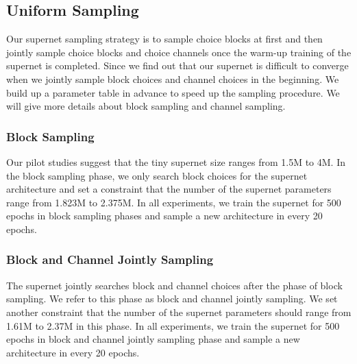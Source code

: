 \documentclass[journal]{IEEEtran}
\begin{document}
\subsection{\textbf{Uniform Sampling}}
Our supernet sampling strategy is to sample choice blocks at first and then jointly sample choice blocks and choice channels once the warm-up training of the supernet is completed. Since we find out that our supernet is difficult to converge when we jointly sample block choices and channel choices in the beginning. We build up a parameter table in advance to speed up the sampling procedure. We will give more details about block sampling and channel sampling.

\subsubsection{\textbf{Block Sampling}}
Our pilot studies suggest that the tiny supernet size ranges from 1.5M to 4M. In the block sampling phase, we only search block choices for the supernet architecture and set a constraint that the number of the supernet parameters range from 1.823M to 2.375M. In all experiments, we train the supernet for 500 epochs in block sampling phases and sample a new architecture in every 20 epochs.

\subsubsection{\textbf{Block and Channel Jointly Sampling}}
The supernet jointly searches block and channel choices after the phase of block sampling. We refer to this phase as block and channel jointly sampling. We set another constraint that the number of the supernet parameters should range from 1.61M to 2.37M in this phase. In all experiments, we train the supernet for 500 epochs in block and channel jointly sampling phase and sample a new architecture in every 20 epochs.
\end{document}
